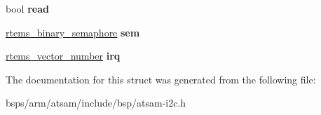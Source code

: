 \begin{DoxyCompactItemize}
\mbox{\label{structatsam__i2c__bus_a2522a8fc9c8dbb360ef6493bc717ca03}} 
bool {\bfseries read}
\item 
\mbox{\label{structatsam__i2c__bus_a22db680c29f22901c01a2cc601efd335}} 
\mbox{\hyperlink{structrtems__binary__semaphore}{rtems\+\_\+binary\+\_\+semaphore}} {\bfseries sem}
\item 
\mbox{\label{structatsam__i2c__bus_aa7c4ece8af346d201b3ce1da78509efb}} 
\mbox{\hyperlink{group__ClassicINTR_ga3e434c197d99f128e78cae4d9358bd8b}{rtems\+\_\+vector\+\_\+number}} {\bfseries irq}
\end{DoxyCompactItemize}


The documentation for this struct was generated from the following file\+:\begin{DoxyCompactItemize}
\item 
bsps/arm/atsam/include/bsp/atsam-\/i2c.\+h\end{DoxyCompactItemize}
